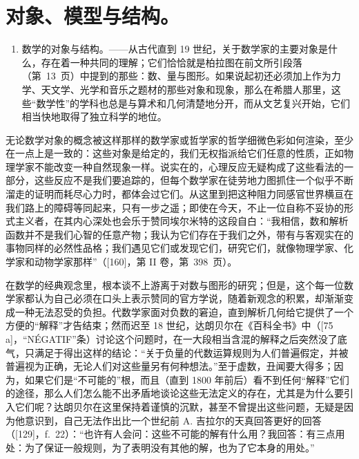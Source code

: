 \section*{对象、模型与结构。}
{}

\begin{enumerate}
\def\labelenumi{\Alph{enumi})}
\tightlist
\item
  数学的对象与结构。——从古代直到 19 世纪，关于数学家的主要对象是什么，存在着一种共同的理解；它们恰恰就是柏拉图在前文所引段落（第~13~页）中提到的那些：数、量与图形。如果说起初还必须加上作为力学、天文学、光学和音乐之题材的那些对象和现象，那么在希腊人那里，这些“数学性”的学科也总是与算术和几何清楚地分开，而从文艺复兴开始，它们相当快地取得了独立科学的地位。
\end{enumerate}

无论数学对象的概念被这样那样的数学家或哲学家的哲学细微色彩如何渲染，至少在一点上是一致的：这些对象是给定的，我们无权指派给它们任意的性质，正如物理学家不能改变一种自然现象一样。说实在的，心理反应无疑构成了这些看法的一部分，这些反应不是我们要追踪的，但每个数学家在徒劳地力图抓住一个似乎不断溜走的证明而耗尽心力时，都体会过它们。从这里到把这种阻力同感官世界横亘在我们路上的障碍等同起来，只有一步之遥；即使在今天，不止一位自称不妥协的形式主义者，在其内心深处也会乐于赞同埃尔米特的这段自白：“我相信，数和解析函数并不是我们心智的任意产物；我认为它们存在于我们之外，带有与客观实在的事物同样的必然性品格；我们遇见它们或发现它们，研究它们，就像物理学家、化学家和动物学家那样”（{[}160{]}，第 II 卷，第~398~页）。

在数学的经典观念里，根本谈不上游离于对数与图形的研究；但是，这个每一位数学家都认为自己必须在口头上表示赞同的官方学说，随着新观念的积累，却渐渐变成一种无法忍受的负担。代数学家面对负数的窘迫，直到解析几何给它提供了一个方便的“解释”才告结束；然而迟至 18 世纪，达朗贝尔在《百科全书》中（{[}75 a{]}，“NÉGATIF”条）讨论这个问题时，在一大段相当含混的解释之后突然没了底气，只满足于得出这样的结论：“关于负量的代数运算规则为人们普遍假定，并被普遍视为正确，无论人们对这些量另有何种想法。”至于虚数，丑闻要大得多；因为，如果它们是“不可能的”根，而且（直到 1800 年前后）看不到任何“解释”它们的途径，那么人们怎么能不出矛盾地谈论这些无法定义的存在，尤其是为什么要引入它们呢？达朗贝尔在这里保持着谨慎的沉默，甚至不曾提出这些问题，无疑是因为他意识到，自己无法作出比一个世纪前 A. 吉拉尔的天真回答更好的回答（{[}129{]}，f.~22）：“也许有人会问：这些不可能的解有什么用？我回答：有三点用处：为了保证一般规则，为了表明没有其他的解，也为了它本身的用处。”

